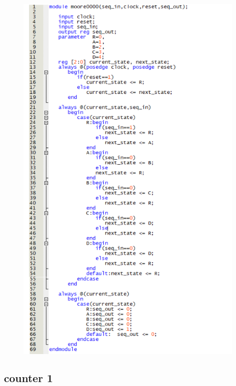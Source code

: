 \documentclass[a4paper]{article}
\begin{document}
	\newpage
	\begin{center}
	\begin{figure}[H]
		\begin{center}
			\includegraphics[scale=.8] {02.png}
		\end{center}
	\end{figure}
	\end{center}	
	\newpage
	
	\subsection{counter 1}
	
\end{document}
